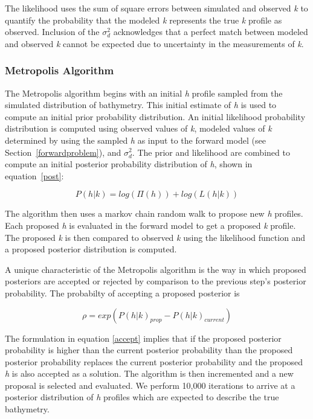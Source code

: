 The likelihood uses the sum of square errors between simulated and observed \textit{k} to quantify the probability that the modeled \textit{k} represents the true \textit{k} profile as observed. Inclusion of the $\sigma_{d}^2$ acknowledges that a perfect match between modeled and observed \textit{k} cannot be expected due to uncertainty in the measurements of \textit{k}.

\subsubsection{Metropolis Algorithm}
The Metropolis algorithm begins with an initial \textit{h} profile sampled from the simulated distribution of bathymetry. This initial estimate of \textit{h} is used to compute an initial prior probability distribution. An initial likelihood probability distribution is computed using observed values of \textit{k}, modeled values of \textit{k} determined by using the sampled \textit{h} as input to the forward model (see Section~\ref{forwardproblem}), and $\sigma_{d}^2$. The prior and likelihood are combined to compute an initial posterior probability distribution of \textit{h}, shown in equation~\ref{post}:

\begin{equation}\label{post}
P(h|%
k) = log(\Pi(h)) + log(L(h|%
k))
\end{equation}

The algorithm then uses a markov chain random walk to propose new \textit{h} profiles. Each proposed \textit{h} is evaluated in the forward model to get a proposed \textit{k} profile. The proposed \textit{k} is then compared to observed \textit{k} using the likelihood function and a proposed posterior distribution is computed.

A unique characteristic of the Metropolis algorithm is the way in which proposed posteriors are accepted or rejected by comparison to the previous step's posterior probability. The probabilty of accepting a proposed posterior is 

\begin{equation}\label{accept}
\rho = exp(P(h|%
k)_{prop} - P(h|%
k)_{current})
\end{equation}

The formulation in equation \ref{accept} implies that if the proposed posterior probability is higher than the current posterior probability than the proposed posterior probability replaces the current posterior probability and the proposed \textit{h} is also accepted as a solution. The algorithm is then incremented and a new proposal is selected and evaluated. We perform 10,000 iterations to arrive at a posterior distribution of \textit{h} profiles which are expected to describe the true bathymetry.















